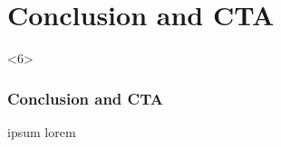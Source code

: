\documentclass[hyperref={draft}]{beamer}
\begin{document}
\section{Conclusion and CTA}

\begin{frame}<6>
  \frametitle{Conclusion and CTA}
ipsum lorem
\end{frame}















\end{document}
